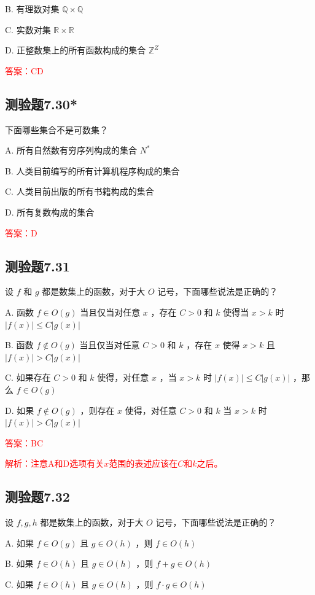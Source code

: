 \documentclass[UTF8, heading=true]{ctexart}
\begin{document}
B. 有理数对集 $\mathbb{Q} \times \mathbb{Q}$

C. 实数对集 $\mathbb{R} \times \mathbb{R}$

D. 正整数集上的所有函数构成的集合 $\mathbb{Z}^Z$

\textcolor{red}{答案：CD}

\subsection{测验题7.30*}

下面哪些集合不是可数集？

A. 所有自然数有穷序列构成的集合 $N^*$

B. 人类目前编写的所有计算机程序构成的集合

C. 人类目前出版的所有书籍构成的集合

D. 所有复数构成的集合

\textcolor{red}{答案：D}

\subsection{测验题7.31}

设 $f$ 和 $g$ 都是数集上的函数，对于大 $O$ 记号，下面哪些说法是正确的？

A. 
函数 $f \in O(g)$ 当且仅当对任意 $x$ ，存在 $C>0$ 和 $k$ 使得当 $x>k$ 时 $|f(x)| \leq C|g(x)|$

B. 
函数 $f \notin O(g)$ 当且仅当对任意 $C>0$ 和 $k$ ，存在 $x$ 使得 $x>k$ 且 $|f(x)|>C|g(x)|$

C. 
如果存在 $C>0$ 和 $k$ 使得，对任意 $x$ ，当 $x>k$ 时 $|f(x)| \leq C|g(x)|$ ，那么 $f \in O(g)$

D. 
如果 $f \notin O(g)$ ，则存在 $x$ 使得，对任意 $C>0$ 和 $k$ 当 $x>k$ 时 $|f(x)|>C|g(x)|$

\textcolor{red}{答案：BC}

\textcolor{red}{解析：注意A和D选项有关$x$范围的表述应该在$C$和$k$之后。}

\subsection{测验题7.32}

设 $f, g, h$ 都是数集上的函数，对于大 $O$ 记号，下面哪些说法是正确的？

A. 如果 $f \in O(g)$ 且 $g \in O(h)$ ，则 $f \in O(h)$

B. 如果 $f \in O(h)$ 且 $g \in O(h)$ ，则 $f+g \in O(h)$

C. 如果 $f \in O(h)$ 且 $g \in O(h)$ ，则 $f \cdot g \in O(h)$
\end{document}
